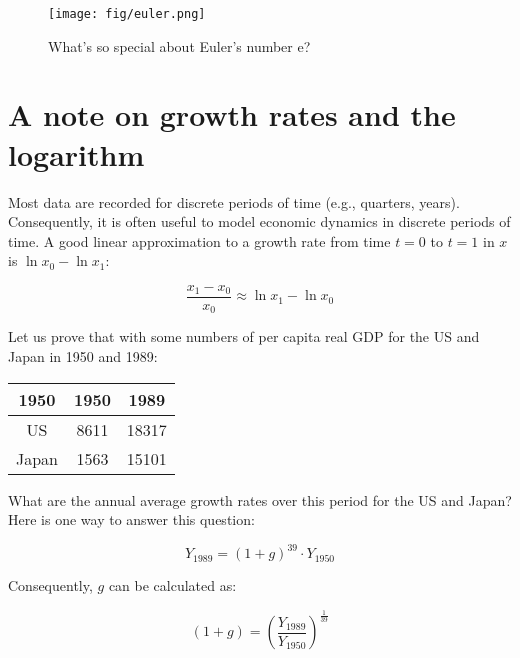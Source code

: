 \begin{figure}
\centering
\texttt{[image: fig/euler.png]}
\caption{\label{fig:euler} What's so special about Euler's number e?}
\end{figure}





























\section{A note on growth rates and the logarithm}\label{a-note-on-growth-rates-and-the-logarithm}

Most data are recorded for discrete periods of time (e.g., quarters, years). Consequently, it is often useful to model economic dynamics in discrete periods of time. A good linear approximation to a growth rate from time \(t=0\) to \(t=1\) in \(x\) is \(\ln x_0 - \ln x_1\):

\[
\frac{x_1 - x_0}{x_0} \approx \ln x_1 - \ln x_0
\]

Let us prove that with some numbers of per capita real GDP for the US and Japan in 1950 and 1989:

\begin{center}
	\begin{tabular}{ccc}\toprule
		1950 & 1950 & 1989 \\ \midrule
		US & 8611 & 18317 \\ 
		Japan & 1563 & 15101 \\ \bottomrule
	\end{tabular} 
\end{center}

What are the annual average growth rates over this period for the US and Japan? Here is one way to answer this question:

\[
Y_{1989} = (1 + g)^{39} \cdot Y_{1950}
\]

Consequently, \(g\) can be calculated as:

\[
(1 + g) = \left(\frac{Y_{1989}}{Y_{1950}}\right)^{\frac{1}{39}}
\]

